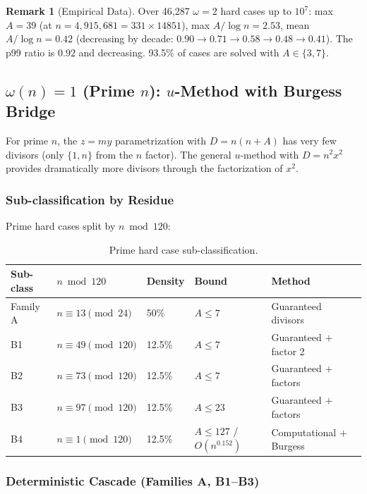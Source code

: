 \documentclass[11pt,a4paper]{article}
\theoremstyle{plain}
\theoremstyle{plain}
\theoremstyle{definition}
\newtheorem{remark}[theorem]{Remark}
\numberwithin{equation}{section}
\begin{document}
\begin{remark}[Empirical Data]
Over 46,287 $\omega = 2$ hard cases up to $10^7$: max $A = 39$ (at $n = 4{,}915{,}681 = 331 \times 14851$), max $A/\log n = 2.53$, mean $A/\log n = 0.42$ (decreasing by decade: $0.90 \to 0.71 \to 0.58 \to 0.48 \to 0.41$). The p99 ratio is $0.92$ and decreasing. 93.5\% of cases are solved with $A \in \{3, 7\}$.
\end{remark}

\subsection{\texorpdfstring{$\omega(n) = 1$}{omega(n) = 1} (Prime \texorpdfstring{$n$}{n}): \texorpdfstring{$u$}{u}-Method with Burgess Bridge}

For prime $n$, the $z = my$ parametrization with $D = n(n+A)$ has very few divisors (only $\{1, n\}$ from the $n$ factor). The general $u$-method with $D = n^2 x^2$ provides dramatically more divisors through the factorization of $x^2$.

\subsubsection{Sub-classification by Residue}

Prime hard cases split by $n \bmod 120$:

\begin{table}[h]
\centering
\begin{tabular}{lllll}
\toprule
Sub-class & $n \bmod 120$ & Density & Bound & Method \\
\midrule
Family A & $n \equiv 13 \pmod{24}$ & 50\% & $A \leq 7$ & Guaranteed divisors \\
B1 & $n \equiv 49 \pmod{120}$ & 12.5\% & $A \leq 7$ & Guaranteed $+$ factor 2 \\
B2 & $n \equiv 73 \pmod{120}$ & 12.5\% & $A \leq 7$ & Guaranteed $+$ factors \\
B3 & $n \equiv 97 \pmod{120}$ & 12.5\% & $A \leq 23$ & Guaranteed $+$ factors \\
B4 & $n \equiv 1 \pmod{120}$ & 12.5\% & $A \leq 127$ / $O(n^{0.152})$ & Computational $+$ Burgess \\
\bottomrule
\end{tabular}
\caption{Prime hard case sub-classification.}
\end{table}

\subsubsection{Deterministic Cascade (Families A, B1--B3)}
\end{document}
